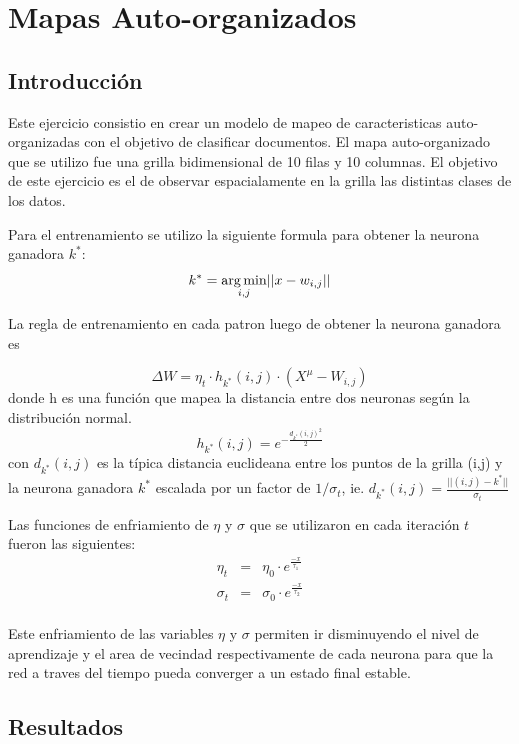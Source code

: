 \section{Mapas Auto-organizados }

\subsection{Introducción}
Este ejercicio consistio en crear un modelo de mapeo de caracteristicas auto-organizadas con el objetivo de clasificar documentos. El mapa
auto-organizado que se utilizo fue una grilla bidimensional de 10 filas y 10 columnas. El objetivo de este ejercicio es el de observar espacialamente
en la grilla las distintas clases de los datos.

Para el entrenamiento se utilizo la siguiente formula para obtener la neurona ganadora $k^*$:
  \[
  k^* = \operatorname*{arg\,min}_{i,j} \lvert\lvert x-w_{i,j} \rvert\rvert
  \]

La regla de entrenamiento en cada patron luego de obtener la neurona ganadora es

\begin{equation}
	\Delta W = \eta_t \cdot h_{k^*}(i,j) \cdot (X^{\mu}-W_{i,j})
\end{equation}
donde h es una función que mapea la distancia entre dos neuronas
según la distribución normal.
\[
	h_{k^*}(i, j) = e^{-\frac{d_{k^*}(i,j)^2}{2}}
\]
con $d_{k^*}(i,j)$ es la típica distancia euclideana entre los puntos de la grilla (i,j) y
la neurona ganadora $k^*$ escalada por un factor de $1/\sigma_t$, ie.
$ d_{k^*}(i,j) = \frac{\lvert \lvert (i,j)-k^* \rvert \rvert}{\sigma_t} $

Las funciones de enfriamiento de $\eta$ y $\sigma$ que se utilizaron
en cada iteración $t$ fueron las siguientes:
\[
  \begin{array}{ccc}
    \eta_t & = & \eta_0 \cdot e^{\frac{-x}{\tau_1}} \\
    \sigma_t & = & \sigma_0 \cdot e^{\frac{-x}{\tau_2}} \\
  \end{array}
\]

Este enfriamiento de las variables $\eta$ y $\sigma$ permiten ir disminuyendo
el nivel de aprendizaje y el area de vecindad respectivamente de cada neurona
para que la red a traves del tiempo pueda converger a un estado final estable.


\subsection{Resultados}
